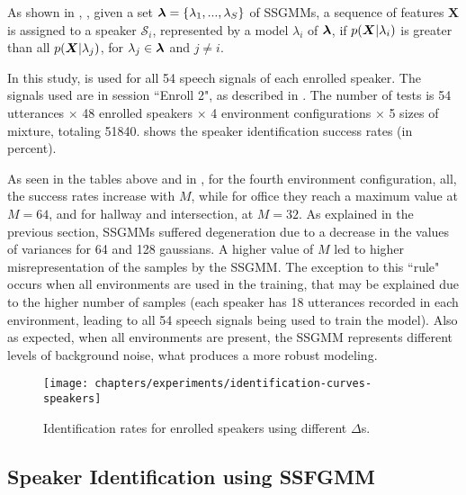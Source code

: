 As shown in , , given a set $\boldsymbol{\lambda} = \{\lambda_1, ..., \lambda_S\}$ of SSGMMs, a sequence of features $\boldsymbol{X}$ is assigned to a speaker $\mathcal{S}_i$, represented by a model $\lambda_i$ of $\boldsymbol{\lambda}$, if $p(\boldsymbol{X}|\lambda_i)$ is greater than all $p(\boldsymbol{X}|\lambda_j)$, for $\lambda_j \in \boldsymbol{\lambda}$ and $j \ne i$.

In this study,  is used for all 54 speech signals of each enrolled speaker. The signals used are in session ``Enroll 2", as described in . The number of tests is 54 utterances $\times$ 48 enrolled speakers $\times$ 4 environment configurations $\times$ 5 sizes of mixture, totaling 51840.  shows the speaker identification success rates (in percent).



As seen in the tables above and in , for the fourth environment configuration, all, the success rates increase with $M$, while for office they reach a maximum value at $M = 64$, and for hallway and intersection, at $M = 32$. As explained in the previous section, SSGMMs suffered degeneration due to a decrease in the values of variances for 64 and 128 gaussians. A higher value of $M$ led to higher misrepresentation of the samples by the SSGMM. The exception to this ``rule" occurs when all environments are used in the training, that may be explained due to the higher number of samples (each speaker has 18 utterances recorded in each environment, leading to all 54 speech signals being used to train the model). Also as expected, when all environments are present, the SSGMM represents different levels of background noise, what produces a more robust modeling.

\begin{figure}[ht]
    \centering
    \texttt{[image: chapters/experiments/identification-curves-speakers]}
    \caption{Identification rates for enrolled speakers using different $\Delta$s.}
    \label{fig:identification-curves-speakers}
\end{figure}

\subsection{Speaker Identification using SSFGMM}

